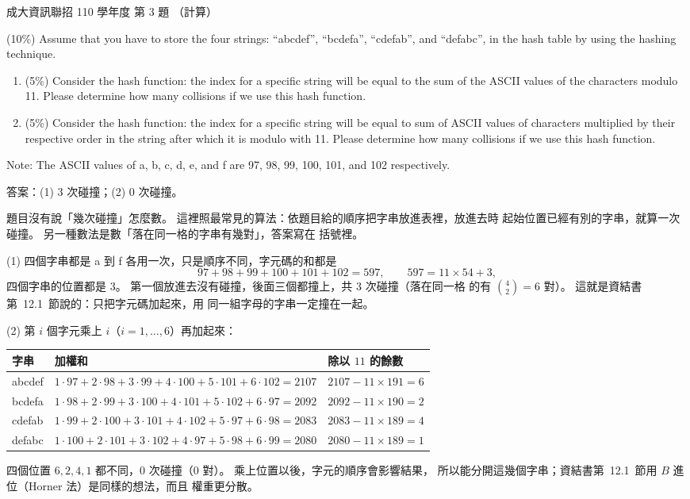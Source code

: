 \begin{pastexam}[label={px:ncku-110-prog-03}]{成大資訊聯招 110 學年度 第 3 題}
（計算）

(10\%) Assume that you have to store the four strings: ``abcdef'', ``bcdefa'', ``cdefab'', and
``defabc'', in the hash table by using the hashing technique.
\begin{enumerate}[label=(\arabic*),itemsep=0pt,topsep=2pt]
\item (5\%) Consider the hash function: the index for a specific string will be equal to the sum
of the ASCII values of the characters modulo 11. Please determine how many collisions if we use
this hash function.
\item (5\%) Consider the hash function: the index for a specific string will be equal to sum of
ASCII values of characters multiplied by their respective order in the string after which it is
modulo with 11. Please determine how many collisions if we use this hash function.
\end{enumerate}
Note: The ASCII values of a, b, c, d, e, and f are 97, 98, 99, 100, 101, and 102 respectively.
\end{pastexam}

\begin{pastsoln}
答案：(1) $3$ 次碰撞；(2) $0$ 次碰撞。

題目沒有說「幾次碰撞」怎麼數。 這裡照最常見的算法：依題目給的順序把字串放進表裡，放進去時
起始位置已經有別的字串，就算一次碰撞。 另一種數法是數「落在同一格的字串有幾對」，答案寫在
括號裡。

(1) 四個字串都是 a 到 f 各用一次，只是順序不同，字元碼的和都是
\[
97 + 98 + 99 + 100 + 101 + 102 = 597, \qquad 597 = 11 \times 54 + 3,
\]
四個字串的位置都是 $3$。 第一個放進去沒有碰撞，後面三個都撞上，共 $3$ 次碰撞（落在同一格
的有 $\binom{4}{2} = 6$ 對）。 這就是資結書第~12.1~節說的：只把字元碼加起來，用
同一組字母的字串一定撞在一起。

(2) 第 $i$ 個字元乘上 $i$（$i = 1, \ldots, 6$）再加起來：
\begin{center}
\small
\begin{tabular}{lll}
\toprule
字串 & 加權和 & 除以 $11$ 的餘數 \\
\midrule
abcdef & $1 \cdot 97 + 2 \cdot 98 + 3 \cdot 99 + 4 \cdot 100 + 5 \cdot 101 + 6 \cdot 102 = 2107$ & $2107 - 11 \times 191 = 6$ \\
bcdefa & $1 \cdot 98 + 2 \cdot 99 + 3 \cdot 100 + 4 \cdot 101 + 5 \cdot 102 + 6 \cdot 97 = 2092$ & $2092 - 11 \times 190 = 2$ \\
cdefab & $1 \cdot 99 + 2 \cdot 100 + 3 \cdot 101 + 4 \cdot 102 + 5 \cdot 97 + 6 \cdot 98 = 2083$ & $2083 - 11 \times 189 = 4$ \\
defabc & $1 \cdot 100 + 2 \cdot 101 + 3 \cdot 102 + 4 \cdot 97 + 5 \cdot 98 + 6 \cdot 99 = 2080$ & $2080 - 11 \times 189 = 1$ \\
\bottomrule
\end{tabular}
\end{center}
四個位置 $6, 2, 4, 1$ 都不同，$0$ 次碰撞（$0$ 對）。 乘上位置以後，字元的順序會影響結果，
所以能分開這幾個字串；資結書第~12.1~節用 $B$ 進位（Horner 法）是同樣的想法，而且
權重更分散。
\end{pastsoln}
